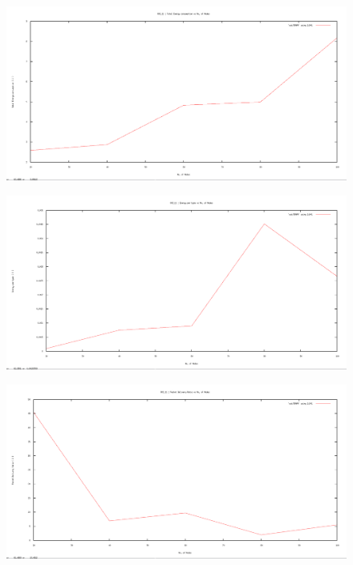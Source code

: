 \documentclass[12pt]{article}
\begin{document}
\begin{figure}[H]
	\centering
	\includegraphics[scale=	0.26]{image/802.15.4/Energyconsumption_vs_nodes.png}
\end{figure}

\begin{figure}[H]
	\centering
	\includegraphics[scale=	0.26]{image/802.15.4/Energyperbytes_vs_nodes.png}
\end{figure}

\begin{figure}[H]
	\centering
	\includegraphics[scale=	0.26]{image/802.15.4/Packetdeliveryratio_vs_nodes.png}
\end{figure}
\end{document}
